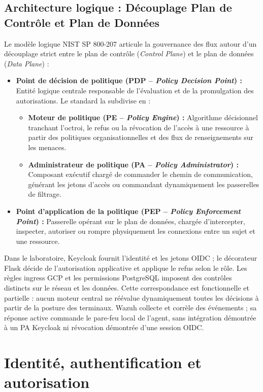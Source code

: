 \documentclass[a4paper,12pt]{report}
\begin{document}
\subsection{Architecture logique : Découplage Plan de Contrôle et Plan de Données}
Le modèle logique NIST SP 800-207 articule la gouvernance des flux autour d'un découplage strict entre le plan de contrôle (\textit{Control Plane}) et le plan de données (\textit{Data Plane}) :
\begin{itemize}
    \item \textbf{Point de décision de politique (PDP -- \textit{Policy Decision Point}) :} Entité logique centrale responsable de l'évaluation et de la promulgation des autorisations. Le standard la subdivise en :
    \begin{itemize}
        \item \textbf{Moteur de politique (PE -- \textit{Policy Engine}) :} Algorithme décisionnel tranchant l'octroi, le refus ou la révocation de l'accès à une ressource à partir des politiques organisationnelles et des flux de renseignements sur les menaces.
        \item \textbf{Administrateur de politique (PA -- \textit{Policy Administrator}) :} Composant exécutif chargé de commander le chemin de communication, générant les jetons d'accès ou commandant dynamiquement les passerelles de filtrage.
    \end{itemize}
    \item \textbf{Point d'application de la politique (PEP -- \textit{Policy Enforcement Point}) :} Passerelle opérant sur le plan de données, chargée d'intercepter, inspecter, autoriser ou rompre physiquement les connexions entre un sujet et une ressource.
\end{itemize}

Dans le laboratoire, Keycloak fournit l'identité et les jetons OIDC ; le décorateur Flask décide de l'autorisation applicative et applique le refus selon le rôle. Les règles ingress GCP et les permissions PostgreSQL imposent des contrôles distincts sur le réseau et les données. Cette correspondance est fonctionnelle et partielle : aucun moteur central ne réévalue dynamiquement toutes les décisions à partir de la posture des terminaux. Wazuh collecte et corrèle des événements ; sa réponse active commande le pare-feu local de l'agent, sans intégration démontrée à un PA Keycloak ni révocation démontrée d'une session OIDC.

\section{Identité, authentification et autorisation}
\end{document}
